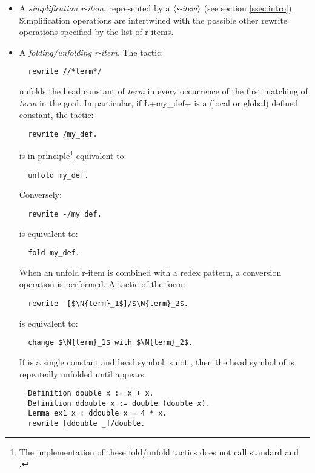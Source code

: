 \begin{itemize}
\item A \emph{simplification r-item}, represented by a
  $\langle\mbox{\itshape\rmfamily\small s-item}\rangle$ (see section \ref{ssec:intro}).
  Simplification operations are
  intertwined with the possible other rewrite operations specified by
  the list of r-items.
\item A \emph{folding/unfolding r-item}. The tactic:
\begin{lstlisting}
  rewrite //*term*/
\end{lstlisting}
unfolds the head constant of \textit{term} in every occurrence of the
first matching of \textit{term} in the goal. In particular, if
\L+my_def+ is a (local or global) defined constant, the tactic:
\begin{lstlisting}
  rewrite /my_def.
\end{lstlisting}
is in principle\footnote{The implementation of these fold/unfold tactics does
  not call standard \Coq{}  and .} equivalent to:
\begin{lstlisting}
  unfold my_def.
\end{lstlisting}
Conversely:
\begin{lstlisting}
  rewrite -/my_def.
\end{lstlisting}
is equivalent to:
\begin{lstlisting}
  fold my_def.
\end{lstlisting}

When an unfold r-item is combined with a redex pattern, a conversion
operation is performed. A tactic of the form:
\begin{lstlisting}
  rewrite -[$\N{term}_1$]/$\N{term}_2$.
\end{lstlisting}
is equivalent to:
\begin{lstlisting}
  change $\N{term}_1$ with $\N{term}_2$.
\end{lstlisting}

If  is a single constant and  head symbol
is not , then the head symbol of  is
repeatedly unfolded until  appears.

\begin{lstlisting}
  Definition double x := x + x.
  Definition ddouble x := double (double x).
  Lemma ex1 x : ddouble x = 4 * x.
  rewrite [ddouble _]/double.
\end{lstlisting}


\end{itemize}
